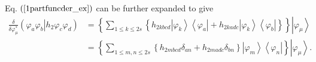 \documentclass[titlepage]{article}%
\begin{document}
Eq. $\left(  \ref{1partfuncder_ex}\right)  $ can be further expanded to give
\begin{align}
\frac{\delta}{\delta\varphi_{\mu}^{\ast}}\left(  \left.  \varphi_{a}%
\varphi_{b}\right\vert h_{2}\varphi_{c}\varphi_{d}\right)   &  =\left\{
\sum_{1\leq k\leq2s}\left\{  h_{2kbcd}\left\vert \varphi_{k}\right\rangle
\left\langle \varphi_{a}\right\vert +h_{2kadc}\left\vert \varphi
_{k}\right\rangle \left\langle \varphi_{b}\right\vert \right\}  \right\}
\left\vert \varphi_{\mu}\right\rangle \nonumber\\
&  =\left\{  \sum_{1\leq m,n\leq2s}\left\{  h_{2mbcd}\delta_{an}%
+h_{2madc}\delta_{bn}\right\}  \left\vert \varphi_{m}\right\rangle
\left\langle \varphi_{n}\right\vert \right\}  \left\vert \varphi_{\mu
}\right\rangle . \label{2partfuncder_ex}%
\end{align}
\end{document}
